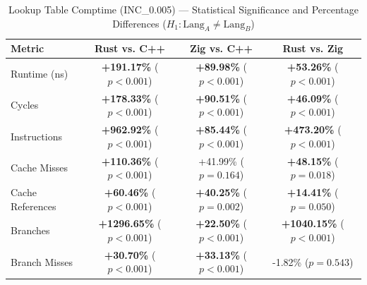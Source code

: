 \begin{table}[htbp]
\centering
\caption{Lookup Table Comptime (INC_0.005) --- Statistical Significance and Percentage Differences ($H_1: \text{Lang}_A \neq \text{Lang}_B$)}
\label{tab:lut_comptime_0_005}
\begin{tabular}{l ccc}
\toprule
\textbf{Metric} & \textbf{Rust vs. C++} & \textbf{Zig vs. C++} & \textbf{Rust vs. Zig} \\
\midrule
Runtime (ns) & \textbf{+191.17\%} ($p < 0.001$) & \textbf{+89.98\%} ($p < 0.001$) & \textbf{+53.26\%} ($p < 0.001$) \\
Cycles & \textbf{+178.33\%} ($p < 0.001$) & \textbf{+90.51\%} ($p < 0.001$) & \textbf{+46.09\%} ($p < 0.001$) \\
Instructions & \textbf{+962.92\%} ($p < 0.001$) & \textbf{+85.44\%} ($p < 0.001$) & \textbf{+473.20\%} ($p < 0.001$) \\
Cache Misses & \textbf{+110.36\%} ($p < 0.001$) & +41.99\% ($p = 0.164$) & \textbf{+48.15\%} ($p = 0.018$) \\
Cache References & \textbf{+60.46\%} ($p < 0.001$) & \textbf{+40.25\%} ($p = 0.002$) & \textbf{+14.41\%} ($p = 0.050$) \\
Branches & \textbf{+1296.65\%} ($p < 0.001$) & \textbf{+22.50\%} ($p < 0.001$) & \textbf{+1040.15\%} ($p < 0.001$) \\
Branch Misses & \textbf{+30.70\%} ($p < 0.001$) & \textbf{+33.13\%} ($p < 0.001$) & -1.82\% ($p = 0.543$) \\
\bottomrule
\end{tabular}
\end{table}


